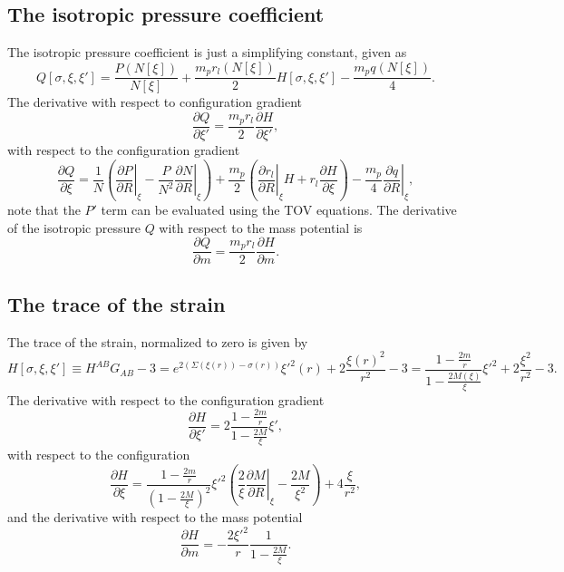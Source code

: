 \subsection{The isotropic pressure coefficient}
The isotropic pressure coefficient is just a simplifying constant, given as
\begin{equation}
Q[\sigma,\xi,\xi'] = \frac{P(N[\xi])}{N[\xi]} +
\frac{m_pr_l\left(N[\xi]\right)}{2}H[\sigma,\xi,\xi']-\frac{m_pq\left(N[\xi]\right)}{4}.
\label{eq:pressureQExpanded}
\end{equation}
The derivative with respect to configuration gradient
\begin{equation}
\frac{\partial Q}{\partial \xi'} = \frac{m_pr_l}{2}\frac{\partial H}{\partial \xi'},
\label{eq:dpressureQ:dxi}
\end{equation}
with respect to the configuration gradient
\begin{equation}
\frac{\partial Q}{\partial \xi} = \frac{1}{N}\left( \left.\frac{\partial P}{\partial R}\right|_\xi - \frac{P}{N^2}\left.\frac{\partial N}{\partial R}\right|_\xi \right)
+\frac{m_p}{2}\left(\left.\frac{\partial r_l}{\partial R}\right|_\xi H + r_l\frac{\partial H}{\partial \xi}\right) - \frac{m_p}{4}\left.\frac{\partial q}{\partial R}\right|_\xi,
\label{eq:dpressureQ:xi}
\end{equation}
note that the $P'$ term can be evaluated using the TOV equations. The derivative of the isotropic pressure $Q$ with respect to the mass potential is
\begin{equation}
\frac{\partial Q}{\partial m} = \frac{m_pr_l}{2}\frac{\partial H}{\partial m}.
\label{eq:dpressureQ:m}
\end{equation}

\subsection{The trace of the strain}
The trace of the strain, normalized to zero is given by
\begin{equation}
H[\sigma,\xi,\xi']\equiv H^{AB}G_{AB} -3= e^{2(\Sigma(\xi(r))-\sigma(r))}\xi'^2(r) +
2\frac{\xi(r)^2}{r^2} - 3 = \frac{1 - \frac{2m}{r}}{1 - \frac{2M(\xi)}{\xi}}\xi'^2 + 2\frac{\xi^2}{r^2} - 3.
\label{eq:traceExpanded}
\end{equation}
The derivative with respect to the configuration gradient
\begin{equation}
\frac{\partial H}{\partial \xi'} = 2\frac{1 - \frac{2m}{r}}{1 - \frac{2M}{\xi}}\xi',
\label{eq:dtrace:dxi}
\end{equation}
with respect to the configuration
\begin{equation}
\frac{\partial H}{\partial \xi} = \frac{1 - \frac{2m}{r}}{\left(1 - \frac{2M}{\xi}\right)^2}\xi'^2\left(\frac{2}{\xi}\left.\frac{\partial M}{\partial R}\right|_\xi - \frac{2M}{\xi^2}\right) + 4\frac{\xi}{r^2},
\label{eq:dtrace:xi}
\end{equation}
and the derivative with respect to the mass potential
\begin{equation}
\frac{\partial H}{\partial m} = -\frac{2\xi'^2}{r}\frac{1}{1 - \frac{2M}{\xi}}.
\label{eq:dtrace:m}
\end{equation}